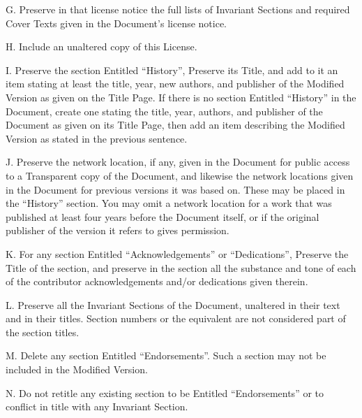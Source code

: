 {\tiny{}G. Preserve in that license notice the full lists of Invariant
Sections and required Cover Texts given in the Document\textsf{'}s license
notice.}{\tiny\par}

{\tiny{}H. Include an unaltered copy of this License.}{\tiny\par}

{\tiny{}I. Preserve the section Entitled \textsf{``}History\textsf{''}, Preserve its
Title, and add to it an item stating at least the title, year, new
authors, and publisher of the Modified Version as given on the Title
Page. If there is no section Entitled \textquotedblleft History\textquotedblright{}
in the Document, create one stating the title, year, authors, and
publisher of the Document as given on its Title Page, then add an
item describing the Modified Version as stated in the previous sentence.}{\tiny\par}

{\tiny{}J. Preserve the network location, if any, given in the Document
for public access to a Transparent copy of the Document, and likewise
the network locations given in the Document for previous versions
it was based on. These may be placed in the \textsf{``}History\textsf{''} section.
You may omit a network location for a work that was published at least
four years before the Document itself, or if the original publisher
of the version it refers to gives permission.}{\tiny\par}

{\tiny{}K. For any section Entitled \textsf{``}Acknowledgements\textsf{''} or \textsf{``}Dedications\textsf{''},
Preserve the Title of the section, and preserve in the section all
the substance and tone of each of the contributor acknowledgements
and/or dedications given therein.}{\tiny\par}

{\tiny{}L. Preserve all the Invariant Sections of the Document, unaltered
in their text and in their titles. Section numbers or the equivalent
are not considered part of the section titles.}{\tiny\par}

{\tiny{}M. Delete any section Entitled \textsf{``}Endorsements\textsf{''}. Such a
section may not be included in the Modified Version.}{\tiny\par}

{\tiny{}N. Do not retitle any existing section to be Entitled \textsf{``}Endorsements\textsf{''}
or to conflict in title with any Invariant Section.}{\tiny\par}

